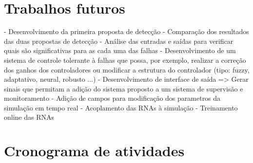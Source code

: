 \label{cap:conclusoes}

\section{Trabalhos futuros}
- Desenvolvimento da primeira proposta de detecção
- Comparação dos resultados das duas propostas de detecção
- Análise das entradas e saídas para verificar quais são significativas para as
  cada uma das falhas
- Desenvolvimento de um sistema de controle tolerante à falhas que possa, por
  exemplo, realizar a correção dos ganhos dos controladores ou modificar a
  estrutura do controlador (tipo: fuzzy, adaptativo, neural, robusto ...)
- Desenvolvimento de interface de saída => Gerar sinais que permitam a adição
  do sistema proposto a um sistema de supervisão e monitoramento
- Adição de campos para modificação dos parametros da simulação em tempo real
- Acoplamento das RNAs à simulação
- Treinamento online das RNAs

\section{Cronograma de atividades}
